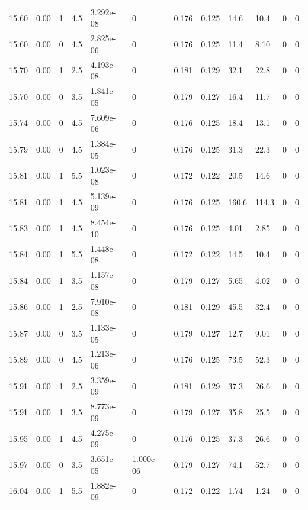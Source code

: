 \documentclass[preview]{standalone}
\begin{document}
{{{{{{{{{{{{{{{\begin{tabular}{L{1.2cm}C{1.2cm} C{0.3cm}C{0.5cm} C{1.4cm}C{1.4cm} C{1.4cm}C{1.4cm} C{1.6cm}C{1.6cm} C{1.6cm}C{1.6cm}}
  15.60  &  0.00  & 1     & 4.5 &  3.292e-08  & 0  &  0.176&   0.125& 14.6 & 10.4   &  0 & 0  \\ 
  15.60  &  0.00  & 0     & 4.5 &  2.825e-06  & 0  &  0.176&   0.125& 11.4 & 8.10   &  0 & 0  \\ 
  15.70  &  0.00  & 1     & 2.5 &  4.193e-08  & 0  &  0.181&   0.129& 32.1 & 22.8   &  0 & 0  \\ 
  15.70  &  0.00  & 0     & 3.5 &  1.841e-05  & 0  &  0.179&   0.127& 16.4 & 11.7   &  0 & 0  \\ 
  15.74  &  0.00  & 0     & 4.5 &  7.609e-06  & 0  &  0.176&   0.125& 18.4 & 13.1   &  0 & 0  \\ 
  15.79  &  0.00  & 0     & 4.5 &  1.384e-05  & 0  &  0.176&   0.125& 31.3 & 22.3   &  0 & 0  \\ 
  15.81  &  0.00  & 1     & 5.5 &  1.023e-08  & 0  &  0.172&   0.122& 20.5 & 14.6   &  0 & 0  \\ 
  15.81  &  0.00  & 1     & 4.5 &  5.139e-09  & 0  &  0.176&   0.125& 160.6 & 114.3   &  0 & 0  \\ 
  15.83  &  0.00  & 1     & 4.5 &  8.454e-10  & 0  &  0.176&   0.125& 4.01 & 2.85   &  0 & 0  \\ 
  15.84  &  0.00  & 1     & 5.5 &  1.448e-08  & 0  &  0.172&   0.122& 14.5 & 10.4   &  0 & 0  \\ 
  15.84  &  0.00  & 1     & 3.5 &  1.157e-08  & 0  &  0.179&   0.127& 5.65 & 4.02   &  0 & 0  \\ 
  15.86  &  0.00  & 1     & 2.5 &  7.910e-08  & 0  &  0.181&   0.129& 45.5 & 32.4   &  0 & 0  \\ 
  15.87  &  0.00  & 0     & 3.5 &  1.133e-05  & 0  &  0.179&   0.127& 12.7 & 9.01   &  0 & 0  \\ 
  15.89  &  0.00  & 0     & 4.5 &  1.213e-06  & 0  &  0.176&   0.125& 73.5 & 52.3   &  0 & 0  \\ 
  15.91  &  0.00  & 1     & 2.5 &  3.359e-09  & 0  &  0.181&   0.129& 37.3 & 26.6   &  0 & 0  \\ 
  15.91  &  0.00  & 1     & 3.5 &  8.773e-09  & 0  &  0.179&   0.127& 35.8 & 25.5   &  0 & 0  \\ 
  15.95  &  0.00  & 1     & 4.5 &  4.275e-09  & 0  &  0.176&   0.125& 37.3 & 26.6   &  0 & 0  \\ 
  15.97  &  0.00  & 0     & 3.5 &  3.651e-05  & 1.000e-06  &  0.179&   0.127& 74.1 & 52.7   &  0 & 0  \\ 
  16.04  &  0.00  & 1     & 5.5 &  1.882e-09  & 0  &  0.172&   0.122& 1.74 & 1.24   &  0 & 0  \\ 

\end{tabular}}}}}}}}}}}}}}}}
\end{document}
